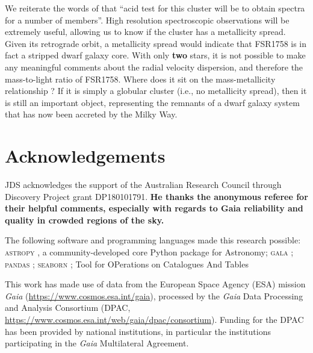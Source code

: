 \documentclass[fleqn,usenatbib]{mnras}
\begin{document}
We reiterate the words of  that ``acid test for this cluster will be to obtain spectra for a number of members''. High resolution spectroscopic observations will be extremely useful, allowing us to know if the cluster has a metallicity spread. Given its retrograde orbit, a metallicity spread would indicate that FSR1758 is in fact a stripped dwarf galaxy core. With only \textbf{two} stars, it is not possible to make any meaningful comments about the radial velocity dispersion, and therefore the mass-to-light ratio of FSR1758. Where does it sit on the mass-metallicity relationship \citep{Kirby2013}? If it is simply a globular cluster (i.e., no metallicity spread), then it is still an important object, representing the remnants of a dwarf galaxy system that has now been accreted by the Milky Way.

\section*{Acknowledgements}

JDS acknowledges the support of the Australian Research Council through Discovery Project grant DP180101791. \textbf{He thanks the anonymous referee for their helpful comments, especially with regards to Gaia reliability and quality in crowded regions of the sky.}

The following software and programming languages made this research possible: \textsc{astropy} \citep[v3.1;][]{TheAstropyCollaboration:2018ti,TheAstropyCollaboration2018}, a community-developed core Python package for Astronomy; \textsc{gala} \citep[v3.0;][]{Price-Whelan2017a,Price-Whelan2018b}; \textsc{pandas} \citep[v0.20.3;][]{McKinney:2010un}; \textsc{seaborn} \citep[v0.8.1;][]{Waskom2018}; Tool for OPerations on Catalogues And Tables \citep[\textsc{topcat}, v4.5;][]{Taylor:2005wx,Taylor:2006wv}

This work has made use of data from the European Space Agency (ESA) mission {\it Gaia} (\url{https://www.cosmos.esa.int/gaia}), processed by the {\it Gaia} Data Processing and Analysis Consortium (DPAC, \url{https://www.cosmos.esa.int/web/gaia/dpac/consortium}). Funding for the DPAC has been provided by national institutions, in particular the institutions participating in the {\it Gaia} Multilateral Agreement.













\bsp	%
\label{lastpage}
\end{document}
